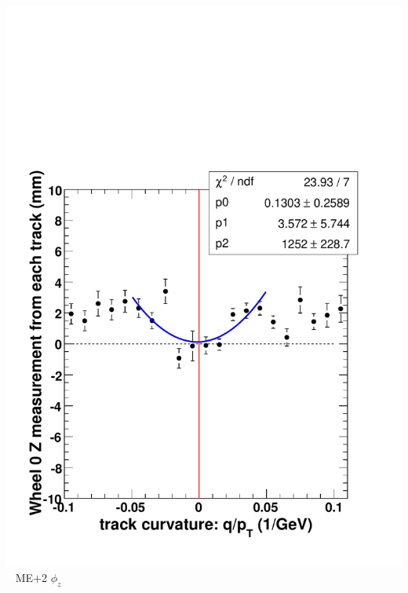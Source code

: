 \documentclass[compress]{beamer}
\begin{document}
\begin{frame}
\begin{columns}
\vspace{0.1 cm}
\includegraphics[width=\linewidth]{extrapolation_wheel0.pdf}
\mbox{ } \hfill ME$+$2 $\phi_z$ \hfill \mbox{ }


\end{columns}
\end{frame}
\end{document}
